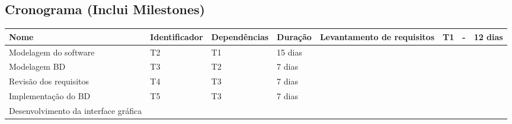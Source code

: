 \bigskip


\bigskip


\bigskip

\clearpage
\subsection{Cronograma (Inclui Milestones)}


\bigskip

\begin{flushleft}
\tablefirsthead{}
\tablehead{}
\tabletail{}
\tablelasttail{}
\begin{supertabular}{|m{8.159cm}|m{2.8669999cm}|m{2.896cm}|m{1.813cm}|}
\hline
\centering \textbf{\textcolor[rgb]{0.078431375,0.09411765,0.13725491}{Nome}} &
\centering \textbf{\textcolor[rgb]{0.078431375,0.09411765,0.13725491}{Identificador}} &
\centering \textbf{\textcolor[rgb]{0.078431375,0.09411765,0.13725491}{Dependências}} &
\centering \textbf{\textcolor[rgb]{0.078431375,0.09411765,0.13725491}{Duração}}&
\hline
\textcolor[rgb]{0.078431375,0.09411765,0.13725491}{Levantamento de requisitos} &
\textcolor[rgb]{0.078431375,0.09411765,0.13725491}{T1} &
\textcolor[rgb]{0.078431375,0.09411765,0.13725491}{{}-} &
\textcolor[rgb]{0.078431375,0.09411765,0.13725491}{12 dias}\\\hline
\textcolor[rgb]{0.078431375,0.09411765,0.13725491}{Modelagem do software } &
\textcolor[rgb]{0.078431375,0.09411765,0.13725491}{T2} &
\textcolor[rgb]{0.078431375,0.09411765,0.13725491}{T1} &
\textcolor[rgb]{0.078431375,0.09411765,0.13725491}{15 dias}\\\hline
\textcolor[rgb]{0.078431375,0.09411765,0.13725491}{Modelagem BD} &
\textcolor[rgb]{0.078431375,0.09411765,0.13725491}{T3} &
\textcolor[rgb]{0.078431375,0.09411765,0.13725491}{T2} &
\textcolor[rgb]{0.078431375,0.09411765,0.13725491}{7 dias}\\\hline
\textcolor[rgb]{0.078431375,0.09411765,0.13725491}{Revisão dos requisitos} &
\textcolor[rgb]{0.078431375,0.09411765,0.13725491}{T4} &
\textcolor[rgb]{0.078431375,0.09411765,0.13725491}{T3} &
\textcolor[rgb]{0.078431375,0.09411765,0.13725491}{7 dias}\\\hline
\textcolor[rgb]{0.078431375,0.09411765,0.13725491}{Implementação do BD} &
\textcolor[rgb]{0.078431375,0.09411765,0.13725491}{T5} &
\textcolor[rgb]{0.078431375,0.09411765,0.13725491}{T3} &
\textcolor[rgb]{0.078431375,0.09411765,0.13725491}{7 dias}\\\hline
\textcolor[rgb]{0.078431375,0.09411765,0.13725491}{Desenvolvimento da interface gráfica} &

\end{supertabular}
\end{flushleft}

